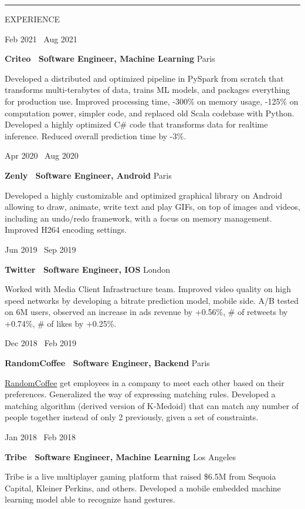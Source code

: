 \documentclass[11pt, a4paper]{article}
\newcommand{\firstcolwidth}{120pt}
\newcommand{\capitalletterspacing}{10}
\newcommand{\spaceaftersection}{1em}
\newcommand{\drawline}{\leavevmode\leaders\hrule height 1pt\hfill\kern 0pt}
\newcommand{\link}[2]{\underline{\textcolor{black}{\href{#1}{#2}}}}
\newcommand{\newsection}[1]{
    \drawline
    \break
    \begin{minipage}[t]{\firstcolwidth}
        \addfontfeature{LetterSpace=\capitalletterspacing}
        \footnotesize{\MakeUppercase{#1}}
        \addfontfeature{LetterSpace=0}
    \end{minipage}
}
\newcommand{\newsectionspace}{
    \begin{minipage}[t]{\linegoal}
        \hfill
        \vspace{\spaceaftersection}
    \end{minipage}
}
\newcommand{\internship}[6]{
    \begin{minipage}[t]{\firstcolwidth}
        \footnotesize{#1 \textemdash\ #2}
    \end{minipage}
    \begin{minipage}[t]{\linegoal}
        \textbf{\normalsize{#3 \textemdash\ #4}}
        \hfill
        \footnotesize{#5}
        \begin{singlespace}
            \begin{flushleft}
                \footnotesize{#6}
            \end{flushleft}
        \end{singlespace}
    \end{minipage}
}
\begin{document}
    \newsection{Experience}
    \newsectionspace
    \internship{Feb 2021}{Aug 2021}{Criteo}{Software Engineer, Machine Learning}{Paris}{
        Developed a distributed and optimized pipeline in PySpark from scratch that transforms multi-terabytes of data, trains ML models, and packages everything for production use. Improved processing time, -300\% on memory usage, -125\% on computation power, simpler code, and replaced old Scala codebase with Python.
        Developed a highly optimized C\# code that transforms data for realtime inference. Reduced overall prediction time by -3\%.
    }
    \newsectionspace
    \internship{Apr 2020}{Aug 2020}{Zenly}{Software Engineer, Android}{Paris}{
        Developed a highly customizable and optimized graphical library on Android allowing to draw, animate, write text and play GIFs, on top of images and videos, including an undo/redo framework, with a focus on memory management. Improved H264 encoding settings.
    }
    \newsectionspace
    \internship{Jun 2019}{Sep 2019}{Twitter}{Software Engineer, IOS}{London}{
        Worked with Media Client Infrastructure team. Improved video quality on high speed networks by developing a bitrate prediction model, mobile side. A/B tested on 6M users, observed an increase in ads revenue by +0.56\%, \# of retweets by +0.74\%, \# of likes by +0.25\%.
    }
    \newsectionspace
    \internship{Dec 2018}{Feb 2019}{RandomCoffee}{Software Engineer, Backend}{Paris}{
        \link{https://www.random-coffee.com}{RandomCoffee} get employees in a company to meet each other based on their preferences. Generalized the way of expressing matching rules.
        Developed a matching algorithm (derived version of K-Medoid) that can match any number of people together instead of only 2 previously, given a set of constraints.
    }
    \newsectionspace
    \internship{Jan 2018}{Feb 2018}{Tribe}{Software Engineer, Machine Learning}{Los Angeles}{
        Tribe is a live multiplayer gaming platform that raised \$6.5M from Sequoia Capital, Kleiner Perkins, and others. Developed a mobile embedded machine learning model able to recognize hand gestures.
    }
\end{document}
